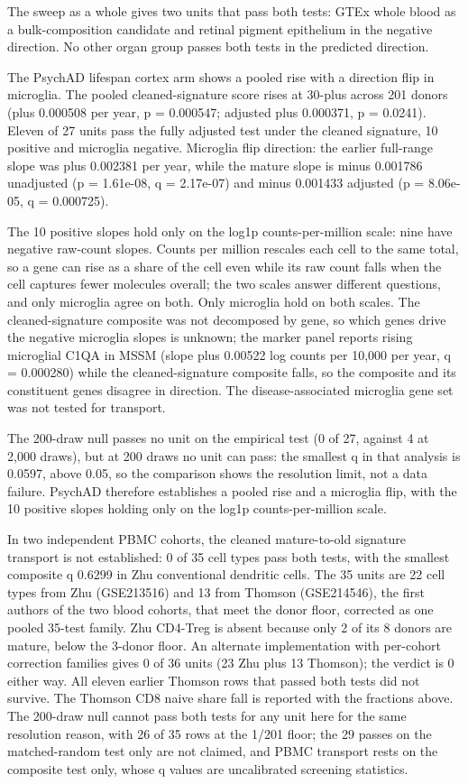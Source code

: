\documentclass[11pt]{article}
\begin{document}
The sweep as a whole gives two units that pass both tests: GTEx whole blood as a bulk-composition candidate and retinal pigment epithelium in the negative direction. No other organ group passes both tests in the predicted direction.

The PsychAD lifespan cortex arm shows a pooled rise with a direction flip in microglia. The pooled cleaned-signature score rises at 30-plus across 201 donors (plus 0.000508 per year, p = 0.000547; adjusted plus 0.000371, p = 0.0241). Eleven of 27 units pass the fully adjusted test under the cleaned signature, 10 positive and microglia negative. Microglia flip direction: the earlier full-range slope was plus 0.002381 per year, while the mature slope is minus 0.001786 unadjusted (p = 1.61e-08, q = 2.17e-07) and minus 0.001433 adjusted (p = 8.06e-05, q = 0.000725).

The 10 positive slopes hold only on the log1p counts-per-million scale: nine have negative raw-count slopes. Counts per million rescales each cell to the same total, so a gene can rise as a share of the cell even while its raw count falls when the cell captures fewer molecules overall; the two scales answer different questions, and only microglia agree on both. Only microglia hold on both scales. The cleaned-signature composite was not decomposed by gene, so which genes drive the negative microglia slopes is unknown; the marker panel reports rising microglial C1QA in MSSM (slope plus 0.00522 log counts per 10,000 per year, q = 0.000280) while the cleaned-signature composite falls, so the composite and its constituent genes disagree in direction. The disease-associated microglia gene set was not tested for transport.

The 200-draw null passes no unit on the empirical test (0 of 27, against 4 at 2,000 draws), but at 200 draws no unit can pass: the smallest q in that analysis is 0.0597, above 0.05, so the comparison shows the resolution limit, not a data failure. PsychAD therefore establishes a pooled rise and a microglia flip, with the 10 positive slopes holding only on the log1p counts-per-million scale.

In two independent PBMC cohorts, the cleaned mature-to-old signature transport is not established: 0 of 35 cell types pass both tests, with the smallest composite q 0.6299 in Zhu conventional dendritic cells. The 35 units are 22 cell types from Zhu (GSE213516) and 13 from Thomson (GSE214546), the first authors of the two blood cohorts, that meet the donor floor, corrected as one pooled 35-test family. Zhu CD4-Treg is absent because only 2 of its 8 donors are mature, below the 3-donor floor. An alternate implementation with per-cohort correction families gives 0 of 36 units (23 Zhu plus 13 Thomson); the verdict is 0 either way. All eleven earlier Thomson rows that passed both tests did not survive. The Thomson CD8 naive share fall is reported with the fractions above. The 200-draw null cannot pass both tests for any unit here for the same resolution reason, with 26 of 35 rows at the 1/201 floor; the 29 passes on the matched-random test only are not claimed, and PBMC transport rests on the composite test only, whose q values are uncalibrated screening statistics.
\end{document}
